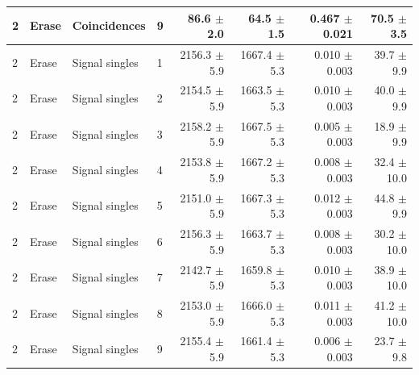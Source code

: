 \begin{tabular}{llllrrrr}
2 & Erase & Coincidences & 9 & 86.6 \ensuremath{\pm} 2.0 & 64.5 \ensuremath{\pm} 1.5 & 0.467 \ensuremath{\pm} 0.021 & 70.5 \ensuremath{\pm} 3.5 \\
\midrule
2 & Erase & Signal singles & 1 & 2156.3 \ensuremath{\pm} 5.9 & 1667.4 \ensuremath{\pm} 5.3 & 0.010 \ensuremath{\pm} 0.003 & 39.7 \ensuremath{\pm} 9.9 \\
2 & Erase & Signal singles & 2 & 2154.5 \ensuremath{\pm} 5.9 & 1663.5 \ensuremath{\pm} 5.3 & 0.010 \ensuremath{\pm} 0.003 & 40.0 \ensuremath{\pm} 9.9 \\
2 & Erase & Signal singles & 3 & 2158.2 \ensuremath{\pm} 5.9 & 1667.5 \ensuremath{\pm} 5.3 & 0.005 \ensuremath{\pm} 0.003 & 18.9 \ensuremath{\pm} 9.9 \\
2 & Erase & Signal singles & 4 & 2153.8 \ensuremath{\pm} 5.9 & 1667.2 \ensuremath{\pm} 5.3 & 0.008 \ensuremath{\pm} 0.003 & 32.4 \ensuremath{\pm} 10.0 \\
2 & Erase & Signal singles & 5 & 2151.0 \ensuremath{\pm} 5.9 & 1667.3 \ensuremath{\pm} 5.3 & 0.012 \ensuremath{\pm} 0.003 & 44.8 \ensuremath{\pm} 9.9 \\
2 & Erase & Signal singles & 6 & 2156.3 \ensuremath{\pm} 5.9 & 1663.7 \ensuremath{\pm} 5.3 & 0.008 \ensuremath{\pm} 0.003 & 30.2 \ensuremath{\pm} 10.0 \\
2 & Erase & Signal singles & 7 & 2142.7 \ensuremath{\pm} 5.9 & 1659.8 \ensuremath{\pm} 5.3 & 0.010 \ensuremath{\pm} 0.003 & 38.9 \ensuremath{\pm} 10.0 \\
2 & Erase & Signal singles & 8 & 2153.0 \ensuremath{\pm} 5.9 & 1666.0 \ensuremath{\pm} 5.3 & 0.011 \ensuremath{\pm} 0.003 & 41.2 \ensuremath{\pm} 10.0 \\
2 & Erase & Signal singles & 9 & 2155.4 \ensuremath{\pm} 5.9 & 1661.4 \ensuremath{\pm} 5.3 & 0.006 \ensuremath{\pm} 0.003 & 23.7 \ensuremath{\pm} 9.8 \\
\bottomrule
\end{tabular}
